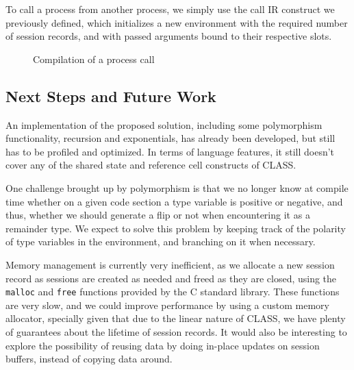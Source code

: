 \begin{compilation}{}{\emptyset}
\end{compilation}

To call a process from another process, we simply use the call IR construct we previously defined, which initializes a new environment with the required number of session records, and with passed arguments bound to their respective slots.

\begin{figure}[H]
    \centering
    \begin{compilation}{}{\varepsilon}
    \end{compilation}
    \caption{Compilation of a process call}
    \label{fig:ProcessCallCompilation}
\end{figure}

\subsection{Next Steps and Future Work}

An implementation of the proposed solution, including some polymorphism functionality, recursion and exponentials, has already been developed, but still has to be profiled and optimized. In terms of language features, it still doesn't cover any of the shared state and reference cell constructs of CLASS.

One challenge brought up by polymorphism is that we no longer know at compile time whether on a given code section a type variable is positive or negative, and thus, whether we should generate a flip or not when encountering it as a remainder type. We expect to solve this problem by keeping track of the polarity of type variables in the environment, and branching on it when necessary.

Memory management is currently very inefficient, as we allocate a new session record as sessions are created as needed and freed as they are closed, using the \texttt{malloc} and \texttt{free} functions provided by the C standard library. These functions are very slow, and we could improve performance by using a custom memory allocator, specially given that due to the linear nature of CLASS, we have plenty of guarantees about the lifetime of session records. It would also be interesting to explore the possibility of reusing data by doing in-place updates on session buffers, instead of copying data around.


